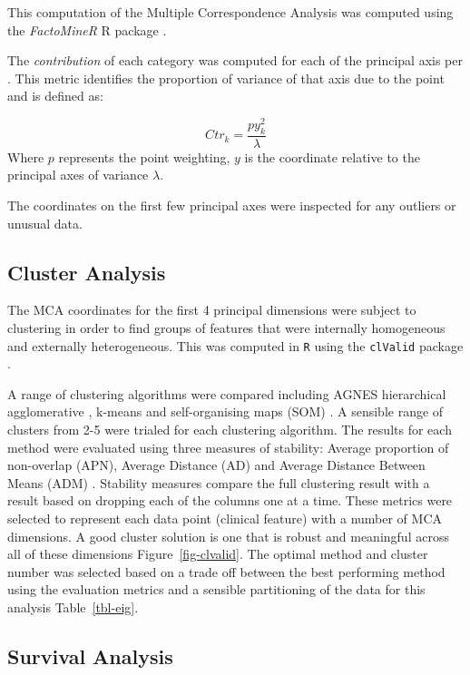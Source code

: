 \documentclass[
  authoryear,
  preprint,
  3p]{elsarticle}
\begin{document}
This computation of the Multiple Correspondence Analysis was computed
using the \emph{FactoMineR} R package \citep{factominer}.

The \emph{contribution} of each category was computed for each of the
principal axis per \citet{le2010multiple}. This metric identifies the
proportion of variance of that axis due to the point and is defined as:

\[
Ctr_k = \frac{py_k^2}{\lambda}
\] Where \(p\) represents the point weighting, \(y\) is the coordinate
relative to the principal axes of variance \(\lambda\).

The coordinates on the first few principal axes were inspected for any
outliers or unusual data.

\hypertarget{cluster-analysis}{%
\subsection{Cluster Analysis}\label{cluster-analysis}}

The MCA coordinates for the first 4 principal dimensions were subject to
clustering in order to find groups of features that were internally
homogeneous and externally heterogeneous. This was computed in
\texttt{R} using the \texttt{clValid} package \citep{clvalid}.

A range of clustering algorithms were compared including AGNES
hierarchical agglomerative \citep{kaufman2009finding}, k-means
\citep{hartigan1979algorithm} and self-organising maps (SOM)
\citep{kohonen2012self}. A sensible range of clusters from 2-5 were
trialed for each clustering algorithm. The results for each method were
evaluated using three measures of stability: Average proportion of
non-overlap (APN), Average Distance (AD) and Average Distance Between
Means (ADM) \citep{datta2003comparisons}. Stability measures compare the
full clustering result with a result based on dropping each of the
columns one at a time. These metrics were selected to represent each
data point (clinical feature) with a number of MCA dimensions. A good
cluster solution is one that is robust and meaningful across all of
these dimensions Figure~\ref{fig-clvalid}. The optimal method and
cluster number was selected based on a trade off between the best
performing method using the evaluation metrics and a sensible
partitioning of the data for this analysis Table~\ref{tbl-eig}.

\hypertarget{survival-analysis}{%
\subsection{Survival Analysis}\label{survival-analysis}}
\end{document}
